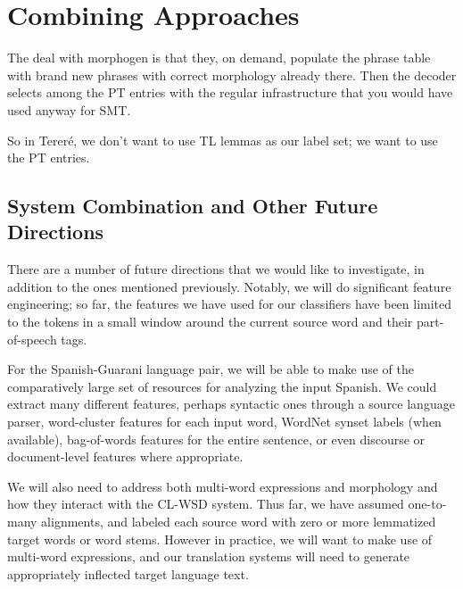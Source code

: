 \chapter{Combining Approaches}
\label{chap:combinations}

The deal with morphogen \cite{chahuneau:2013:emnlp}
is that they, on demand, populate the phrase table with brand new phrases with
correct morphology already there. Then the decoder selects among the PT entries
with the regular infrastructure that you would have used anyway for SMT.

So in Tereré, we don't want to use TL lemmas as our label set; we want to use
the PT entries.

\section{System Combination and Other Future Directions}
There are a number of future directions that we would like to investigate, in
addition to the ones mentioned previously.
Notably, we will do significant feature engineering; so far, the features we
have used for our classifiers have been limited to the tokens in a small window
around the current source word and their part-of-speech tags.

For the Spanish-Guarani language pair, we will be able to make use of
the comparatively large set of resources for analyzing the input Spanish.
We could extract many different features, perhaps syntactic ones through a
source language parser, word-cluster features for each input word, WordNet
synset labels (when available), bag-of-words features for the entire sentence,
or even discourse or document-level features where appropriate.



We will also need to address both multi-word expressions and morphology and how
they interact with the CL-WSD system.
Thus far, we have assumed one-to-many alignments, and labeled each source word
with zero or more lemmatized target words or word stems.
However in practice, we will want to make use of multi-word expressions, and
our translation systems will need to generate appropriately inflected target
language text.

